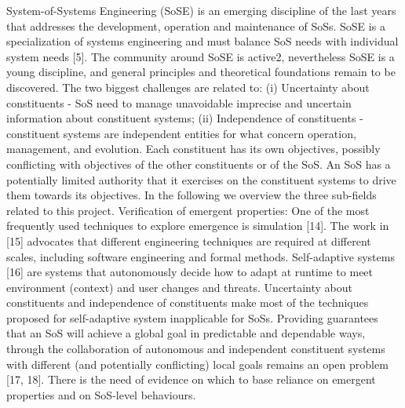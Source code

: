 System-of-Systems Engineering (SoSE) is an emerging discipline of the last years that addresses the development,
operation and maintenance of SoSs. SoSE is a specialization of systems engineering and must balance
SoS needs with individual system needs [5]. The community around SoSE is active2, nevertheless SoSE is a
young discipline, and general principles and theoretical foundations remain to be discovered. The two
biggest challenges are related to: (i) Uncertainty about constituents - SoS need to manage unavoidable imprecise
and uncertain information about constituent systems; (ii) Independence of constituents - constituent systems
are independent entities for what concern operation, management, and evolution. Each constituent has its own
objectives, possibly conflicting with objectives of the other constituents or of the SoS. An SoS has a potentially
limited authority that it exercises on the constituent systems to drive them towards its objectives. In the following
we overview the three sub-fields related to this project.
Verification of emergent properties: One of the most frequently used techniques to explore emergence is simulation
[14]. The work in [15] advocates that different engineering techniques are required at different scales,
including software engineering and formal methods. Self-adaptive systems [16] are systems that autonomously
decide how to adapt at runtime to meet environment (context) and user changes and threats. Uncertainty about
constituents and independence of constituents make most of the techniques proposed for self-adaptive system
inapplicable for SoSs. Providing guarantees that an SoS will achieve a global goal in predictable and dependable
ways, through the collaboration of autonomous and independent constituent systems with different (and
potentially conflicting) local goals remains an open problem [17, 18]. There is the need of evidence on which
to base reliance on emergent properties and on SoS-level behaviours.


